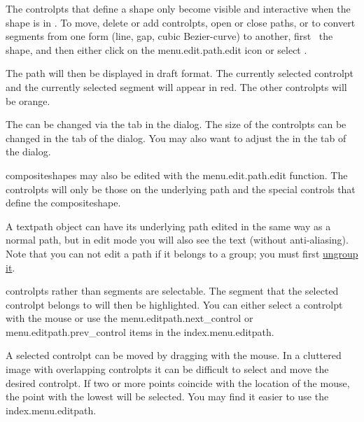 The \glspl{controlpt} that define a \gls{shape} only become visible
and interactive when the shape is in \editpathmode.
To move, delete or add \glspl{controlpt}, open or close
\glspl{path}, or to convert segments from one form (line, \gls{gap}, cubic
\gls{Bezier-curve}) to another, first \select\ the \gls*{shape}, and
then either click on the \gls{menu.edit.path.edit} icon or select
.

The \gls*{path} will then be displayed in draft format.  The
currently selected \gls*{controlpt} and the currently selected
segment will appear in red. The other \glspl*{controlpt} will be
orange.

\begin{information}
The  can be changed via the 
tab in the  dialog. The size of the
\glspl{controlpt} can be changed in the  tab
of the  dialog. You may also want to adjust the
 in the  tab of the
 dialog.
\end{information}

\Glspl{compositeshape} may also be edited with 
the \gls{menu.edit.path.edit} function. The
\glspl{controlpt} will only be those on the underlying path and 
the special controls that define the \gls{compositeshape}.

A \gls{textpath} object can have its underlying path edited in the
same way as a normal \gls{path}, but in edit mode you will also see
the text (without \gls{anti-aliasing}).  Note that you can not edit
a \gls{path} if it belongs to a \gls{group}; you must first
\hyperref[sec:grouping]{ungroup it}.

\begin{information}
\Glspl{controlpt} rather than segments are selectable. The segment
that the selected \gls{controlpt} belongs to will then be
highlighted. You can either select a \gls{controlpt} with the mouse
or use the \gls{menu.editpath.next_control} or \gls{menu.editpath.prev_control}
items in the \gls{index.menu.editpath}.
\end{information}

A selected \gls{controlpt} can be moved by dragging with the mouse.
In a cluttered image with overlapping \glspl{controlpt} it can be
difficult to select and move the desired \gls{controlpt}.
If two or more points coincide
with the location of the mouse, the point with the lowest
 will be selected.
You may find it easier to use the \gls{index.menu.editpath}.

